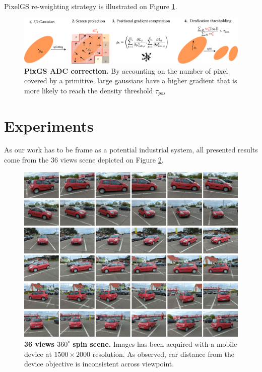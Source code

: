 PixelGS re-weighting strategy is illustrated on Figure \ref{fig:pixgs-adc}. 



\begin{figure}[htbp!]
    \center
  \includegraphics[width=\linewidth]{images/gaussiansplatting/pixgs_implem_improvement.png}
  \caption{\textbf{PixGS ADC correction.} By accounting on the number of pixel covered by a primitive, large gaussians have a higher gradient that is more likely to reach the density threshold $\tau_{pos}$}
  \label{fig:pixgs-adc}
\end{figure}



\section{Experiments}
\label{sec:exp-gs}

As our work has to be frame as a potential industrial system, all presented results come from the 36 views scene depicted on Figure \ref{fig:all_views}. 
\begin{figure}[htpb!]
  \center
\includegraphics[width=.9\linewidth]{images/gaussiansplatting/original_scene.png}
\caption{\textbf{36 views $360^{\circ}$ spin scene.} Images has been acquired with a mobile device at $1500\times 2000$ resolution. As observed, car distance from the device objective is inconsistent across viewpoint.}
\label{fig:all_views}
\end{figure}

